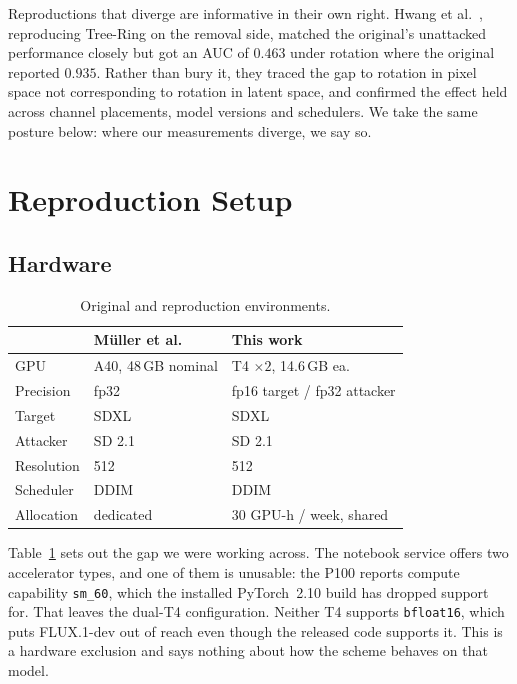 \documentclass[10pt,twocolumn]{article}
\newcommand{\code}[1]{\texttt{\small #1}}
\begin{document}
Reproductions that diverge are informative in their own right. Hwang et
al.~\cite{hwang2024invisible}, reproducing Tree-Ring on the removal side, matched the
original's unattacked performance closely but got an AUC of $0.463$ under rotation
where the original reported $0.935$. Rather than bury it, they traced the gap to
rotation in pixel space not corresponding to rotation in latent space, and confirmed
the effect held across channel placements, model versions and schedulers. We take the
same posture below: where our measurements diverge, we say so.
\section{Reproduction Setup}
\label{sec:setup}

\subsection{Hardware}

\begin{table}[t]
\centering\small
\caption{Original and reproduction environments.}
\label{tab:hw}
\begin{tabular}{lll}
\toprule
 & M\"uller et al. & This work \\
\midrule
GPU         & A40, 48\,GB nominal & T4 $\times 2$, 14.6\,GB ea. \\
Precision   & fp32            & fp16 target / fp32 attacker \\
Target      & SDXL            & SDXL \\
Attacker    & SD 2.1          & SD 2.1 \\
Resolution  & 512             & 512 \\
Scheduler   & DDIM            & DDIM \\
Allocation  & dedicated       & 30 GPU-h / week, shared \\
\bottomrule
\end{tabular}
\end{table}

Table~\ref{tab:hw} sets out the gap we were working across. The notebook service
offers two accelerator types, and one of them is unusable: the P100 reports compute
capability \code{sm\_60}, which the installed PyTorch~2.10 build has dropped support
for. That leaves the dual-T4 configuration. Neither T4 supports \code{bfloat16},
which puts FLUX.1-dev out of reach even though the released code supports it. This is
a hardware exclusion and says nothing about how the scheme behaves on that model.
\end{document}
